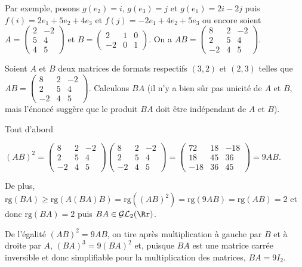 {{Par exemple, posons $g(e_2) = i$, $g(e_3) =j$ et $g(e_1) = 2i-2j$ puis $f(i) = 2e_1+5e_2+4e_3$ et $f(j)=-2e_1+4e_2+5e_3$ ou encore soient $A=\left(
\begin{array}{cc}
2&-2\\
5&4\\
4&5
\end{array}
\right)$ et $B=\left(
\begin{array}{ccc}
2&1&0\\
-2&0&1
\end{array}
\right)$. On a $AB=\left(
\begin{array}{ccc}
8&2&-2\\
2&5&4\\
-2&4&5
\end{array}
\right)$.

Soient $A$ et $B$ deux matrices de formats respectifs $(3,2)$ et $(2,3)$ telles que $AB=\left(
\begin{array}{ccc}
8&2&-2\\
2&5&4\\
-2&4&5
\end{array}
\right)$. Calculons $BA$ (il n'y a bien sûr pas unicité de $A$ et $B$, mais l'énoncé suggère que le produit $BA$ doit être indépendant de $A$ et $B$).

Tout d'abord 

\begin{center}
$(AB)^2=\left(
\begin{array}{ccc}
8&2&-2\\
2&5&4\\
-2&4&5
\end{array}
\right)\left(
\begin{array}{ccc}
8&2&-2\\
2&5&4\\
-2&4&5
\end{array}
\right)=\left(
\begin{array}{ccc}
72&18&-18\\
18&45&36\\
-18&36&45
\end{array}
\right)=9AB$.
\end{center}

De plus, $\text{rg}(BA)\geqslant\text{rg}(A(BA)B)=\text{rg}((AB)^2)=\text{rg}(9AB) =\text{rg}(AB)=2$ et donc $\text{rg}(BA)=2$ puis $BA\in\mathcal{GL}_2(\Rr)$.

De l'égalité $(AB)^2=9AB$, on tire après multiplication à gauche par $B$ et à droite par $A$, $(BA)^3=9(BA)^2$ et, puisque $BA$ est une matrice carrée inversible et donc simplifiable pour la multiplication des matrices, $BA=9I_2$.

\begin{center}
\end{center}
}
}
